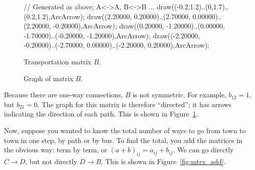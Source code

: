 \documentclass[../textbook.tex]{subfiles}
\begin{document}
\begin{figure}[h]
\begin{center}
\begin{minipage}[b]{0.45\textwidth}
\begin{asy}[width=0.7\textwidth]
				// Generated as above; A<->A, B<->B ...
				draw((-0.2,1.2)..(0,1.7)..(0.2,1.2),ArcArrow);
				draw((2.20000, 0.20000)..(2.70000, 0.00000)..(2.20000, -0.20000),ArcArrow);
				draw((0.20000, -1.20000)..(0.00000, -1.70000)..(-0.20000, -1.20000),ArcArrow);
				draw((-2.20000, -0.20000)..(-2.70000, 0.00000)..(-2.20000, 0.20000),ArcArrow);
			\end{asy}
		\end{minipage}
	\end{center}
	\vspace*{-2\baselineskip}
	\begin{center}
		\begin{minipage}[t]{0.45\textwidth}
			\caption{Transportation matrix $B$.}
			\label{fig:adjacency_b}
		\end{minipage}
		\hfill
		\begin{minipage}[t]{0.45\textwidth}
			\caption{Graph of matrix $B$.}
			\label{fig:directed}
		\end{minipage}
	\end{center}
	\vspace*{-2\baselineskip}
\end{figure}

\noindent Because there are one-way connections, $B$ is not symmetric. For example, $b_{12}=1$, but $b_{21}=0$. The graph for this matrix is therefore ``directed''; it has arrows indicating the direction of each path. This is shown in Figure~\ref{fig:directed}.

Now, suppose you wanted to know the total number of ways to go from town to town in one step, by path or by bus. To find the total, you add the matrices in the obvious way: term by term, or $(a+b)_{ij}=a_{ij}+b_{ij}$. We can go directly $C\to D$, but not directly $D\to B$. This is shown in Figure~\ref{fig:mtrx_add}.
\end{document}
